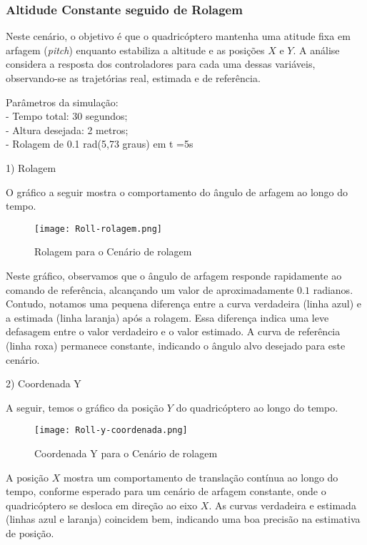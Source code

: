 \subsubsection{Altidude Constante seguido de Rolagem}

Neste cenário, o objetivo é que o quadricóptero mantenha uma atitude fixa em arfagem (\textit{pitch}) enquanto estabiliza a altitude e as posições \(X\) e \(Y\). A análise considera a resposta dos controladores para cada uma dessas variáveis, observando-se as trajetórias real, estimada e de referência.

Parâmetros da simulação: \\

- Tempo total: 30 segundos;\\
- Altura desejada: 2 metros; \\
- Rolagem de 0.1 rad(5,73 graus) em t =5s

1) Rolagem

O gráfico a seguir mostra o comportamento do ângulo de arfagem ao longo do tempo.

\begin{figure}[H]
	\centering
	\texttt{[image: Roll-rolagem.png]}
	\caption{Rolagem para o Cenário de rolagem}
	\label{fig:roll-arfagem}
\end{figure}

Neste gráfico, observamos que o ângulo de arfagem responde rapidamente ao comando de referência, alcançando um valor de aproximadamente \(0.1\) radianos. Contudo, notamos uma pequena diferença entre a curva verdadeira (linha azul) e a estimada (linha laranja) após a rolagem. Essa diferença indica uma leve defasagem entre o valor verdadeiro e o valor estimado. A curva de referência (linha roxa) permanece constante, indicando o ângulo alvo desejado para este cenário.

2) Coordenada Y

A seguir, temos o gráfico da posição \(Y\) do quadricóptero ao longo do tempo.

\begin{figure}[H]
	\centering
	\texttt{[image: Roll-y-coordenada.png]}
	\caption{Coordenada Y para o Cenário de rolagem}
	\label{fig:roll-x-coordenada}
\end{figure}

A posição \(X\) mostra um comportamento de translação contínua ao longo do tempo, conforme esperado para um cenário de arfagem constante, onde o quadricóptero se desloca em direção ao eixo \(X\). As curvas verdadeira e estimada (linhas azul e laranja) coincidem bem, indicando uma boa precisão na estimativa de posição.

